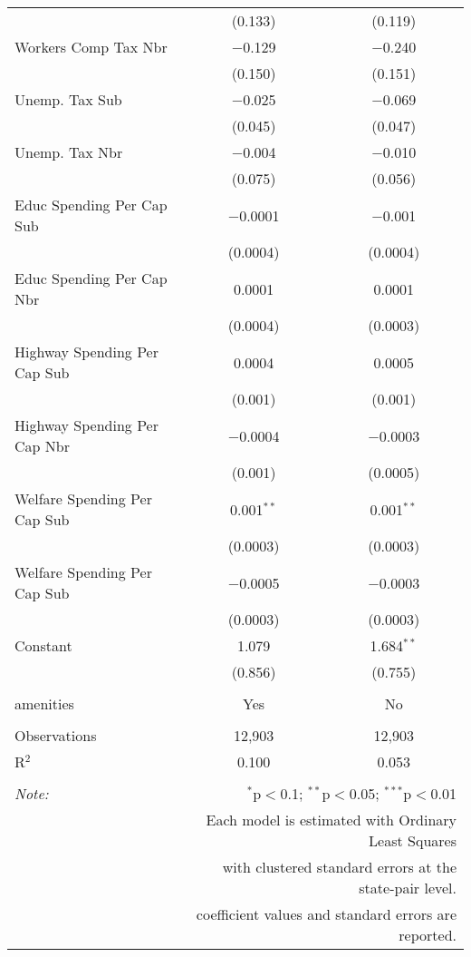 \begin{table}[!htbp]
\begin{tabular}{@{\extracolsep{5pt}}lcc}
  & (0.133) & (0.119) \\ 
  Workers Comp Tax Nbr & $-$0.129 & $-$0.240 \\ 
  & (0.150) & (0.151) \\ 
  Unemp. Tax Sub & $-$0.025 & $-$0.069 \\ 
  & (0.045) & (0.047) \\ 
  Unemp. Tax Nbr & $-$0.004 & $-$0.010 \\ 
  & (0.075) & (0.056) \\ 
  Educ Spending Per Cap Sub & $-$0.0001 & $-$0.001 \\ 
  & (0.0004) & (0.0004) \\ 
  Educ Spending Per Cap Nbr & 0.0001 & 0.0001 \\ 
  & (0.0004) & (0.0003) \\ 
  Highway Spending Per Cap Sub & 0.0004 & 0.0005 \\ 
  & (0.001) & (0.001) \\ 
  Highway Spending Per Cap Nbr & $-$0.0004 & $-$0.0003 \\ 
  & (0.001) & (0.0005) \\ 
  Welfare Spending Per Cap Sub & 0.001$^{**}$ & 0.001$^{**}$ \\ 
  & (0.0003) & (0.0003) \\ 
  Welfare Spending Per Cap Sub & $-$0.0005 & $-$0.0003 \\ 
  & (0.0003) & (0.0003) \\ 
  Constant & 1.079 & 1.684$^{**}$ \\ 
  & (0.856) & (0.755) \\ 
 \hline \\[-1.8ex] 
amenities & Yes & No \\ 
\hline \\[-1.8ex] 
Observations & 12,903 & 12,903 \\ 
R$^{2}$ & 0.100 & 0.053 \\ 
\hline 
\hline \\[-1.8ex] 
\textit{Note:}  & \multicolumn{2}{r}{$^{*}$p$<$0.1; $^{**}$p$<$0.05; $^{***}$p$<$0.01} \\ 
 & \multicolumn{2}{r}{Each model is estimated with Ordinary Least Squares} \\ 
 & \multicolumn{2}{r}{with clustered standard errors at the state-pair level.} \\ 
 & \multicolumn{2}{r}{coefficient values and standard errors are reported.} \\ 
\end{tabular} 
\end{table} 
